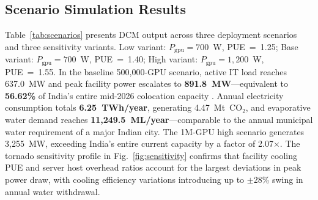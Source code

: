 \documentclass[conference]{IEEEtran}
\begin{document}
\subsection{Scenario Simulation Results}

Table~\ref{tab:scenarios} presents DCM output across three deployment scenarios and three sensitivity variants. Low variant: $P_{\text{gpu}}=700$~W, PUE~=~1.25; Base variant: $P_{\text{gpu}}=700$~W, PUE~=~1.40; High variant: $P_{\text{gpu}}=1{,}200$~W, PUE~=~1.55. In the baseline 500{,}000-GPU scenario, active IT load reaches 637.0~MW and peak facility power escalates to \textbf{891.8~MW}---equivalent to \textbf{56.62\%} of India's entire mid-2026 colocation capacity \cite{jll2026indiadc}. Annual electricity consumption totals \textbf{6.25~TWh/year}, generating 4.47~Mt~CO$_2$, and evaporative water demand reaches \textbf{11{,}249.5~ML/year}---comparable to the annual municipal water requirement of a major Indian city. The 1M-GPU high scenario generates 3{,}255~MW, exceeding India's entire current capacity by a factor of 2.07$\times$. The tornado sensitivity profile in Fig.~\ref{fig:sensitivity} confirms that facility cooling PUE and server host overhead ratios account for the largest deviations in peak power draw, with cooling efficiency variations introducing up to $\pm$28\% swing in annual water withdrawal.
\end{document}
